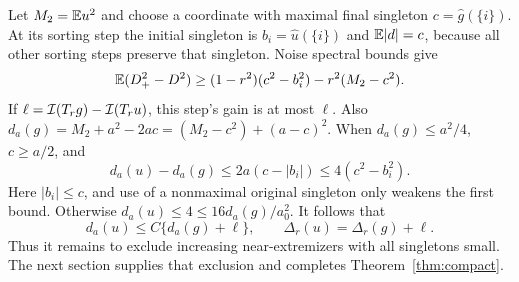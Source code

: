 Let $M_2=\mathbb E u^2$ and choose a coordinate with maximal final singleton
$c=\widehat g(\{i\})$. At its sorting step the initial singleton is
$b_i=\widehat u(\{i\})$ and $\mathbb E|d|=c$, because all other sorting
steps preserve that singleton. Noise spectral bounds give
\[
 \mathbb E(D_+^2-D^2)\ge(1-r^2)(c^2-b_i^2)-r^2(M_2-c^2).
\]
If $\ell=\mathcal I(T_rg)-\mathcal I(T_ru)$, this step's gain is at most $\ell$.
Also $d_a(g)=M_2+a^2-2ac=(M_2-c^2)+(a-c)^2$.
When $d_a(g)\le a^2/4$, $c\ge a/2$, and
\[
 d_a(u)-d_a(g)\le2a(c-|b_i|)\le4(c^2-b_i^2).
\]
Here $|b_i|\le c$, and use of a nonmaximal original singleton only
weakens the first bound. Otherwise $d_a(u)\le4\le16d_a(g)/a_0^2$.
It follows that
\begin{equation}\label{eq:compression}
 d_a(u)\le C\{d_a(g)+\ell\},\qquad
 \Delta_r(u)=\Delta_r(g)+\ell.
\end{equation}
Thus it remains to exclude increasing near-extremizers with all
singletons small. The next section supplies that exclusion and completes
Theorem~\ref{thm:compact}.
